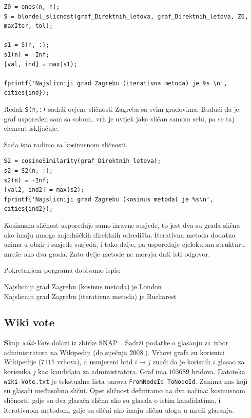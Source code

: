 \documentclass[12pt, letterpaper]{article}
\numberwithin{figure}{section}
\begin{document}
\begin{lstlisting}[style=octave, caption={Iterativna metoda: najsličniji grad Zagrebu}, label={lst:gradovi_blondel}]
Z0 = ones(n, n);
S = blondel_slicnost(graf_Direktnih_letova, graf_Direktnih_letova, Z0, maxIter, tol);

s1 = S(n, :);              
s1(n) = -Inf;             
[val, ind] = max(s1);

fprintf('Najslicniji grad Zagrebu (iterativna metoda) je %s \n', cities{ind});
\end{lstlisting}
Redak \texttt{S(n,:)} sadrži ocjene sličnosti Zagreba sa svim gradovima. Budući da je graf uspoređen sam sa sobom, vrh je uvijek jako sličan samom sebi, pa se taj element isključuje. 

Sada isto radimo sa kosinusnom sličnosti.

\begin{lstlisting}[style=octave, caption={Kosinusna sličnost i spremanje rezultata}, label={lst:gradovi_cos}]
S2 = cosineSimilarity(graf_Direktnih_letova);
s2 = S2(n, :);
s2(n) = -Inf;              
[val2, ind2] = max(s2);
fprintf('Najslicniji grad Zagrebu (kosinus metoda) je %s\n', cities{ind2});
\end{lstlisting}
Kosinusna sličnost uspoređuje samo izravne susjede, to jest dva su grada slična ako imaju mnogo zajedničkih direktnih odredišta. Iterativna metoda dodatno uzima u obzir i susjede susjeda, i tako dalje, pa uspoređuje cjelokupnu strukturu mreže oko dva grada. Zato dvije metode ne moraju dati isti odgovor.

Pokretanjem porgrama dobivamo ispis:

Najslicniji grad Zagrebu (kosinus metoda) je London\\
Najslicniji grad Zagrebu (iterativna metoda) je Bucharest

\subsection{Wiki vote}

\textbf
Skup \emph{wiki-Vote} dolazi iz zbirke SNAP~\cite{leskovec2010}. Sadrži podatke o glasanju za izbor administratora na Wikipediji (do siječnja 2008.). Vrhovi grafa su korisnici Wikipedije ($7115$ vrhova), a usmjereni brid $i\to j$ znači da je korisnik $i$ glasao za korisnika $j$ kao kandidata za administratora. Graf ima $103689$ bridova. Datoteka \texttt{wiki-Vote.txt} je tekstualna lista parova \texttt{FromNodeId ToNodeId}. Zanima nas koji su glasači međusobno slični. Opet sličnost definiramo na dva načina: kosinusnom sličnosti, gdje su dva glasača slična ako su glasala o istim kandidatima, i iterativnom metodom, gdje su slični ako imaju sličnu ulogu u mreži glasanja.
\end{document}
